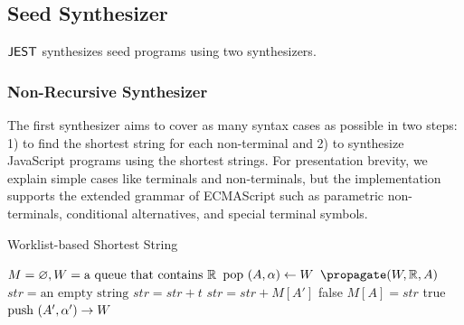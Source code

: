 \subsection{Seed Synthesizer}

$\tool$ synthesizes seed programs using two synthesizers.

\subsubsection{Non-Recursive Synthesizer}
The first synthesizer aims to cover as many syntax cases as possible
in two steps: 1) to find the shortest string for each non-terminal
and 2) to synthesize JavaScript programs using the shortest strings.
For presentation brevity, we explain simple cases like terminals and non-terminals,
but the implementation supports the extended grammar of
ECMAScript such as parametric non-terminals, conditional alternatives,
and special terminal symbols.

\begin{algorithm}[t]
  \caption{Worklist-based Shortest String}
  \label{alg:short-string}
  \DontPrintSemicolon
   {
    $M = \varnothing, W = \text{a queue that contains}\ \mathbb{R}$\;
    \While{$\worklist \neq \varnothing$} {
      $\text{pop}\ (A, \alpha) \gets W$\;
       {
        $\propagate(\worklist, \ruleset, A)$}
    }
  }
   {
    $str = \text{an empty string}$\;
     {
       {
        $str = str + t$
      }
       {
        $str = str + M[A']$
      }
    }
     {
      \Return false
    }
    $M[A] = str$\;
    \Return true\;
  }
   {
     {
       {
        $\text{push}\ (A', \alpha') \rightarrow W$
      }
    }
  }
\end{algorithm}

